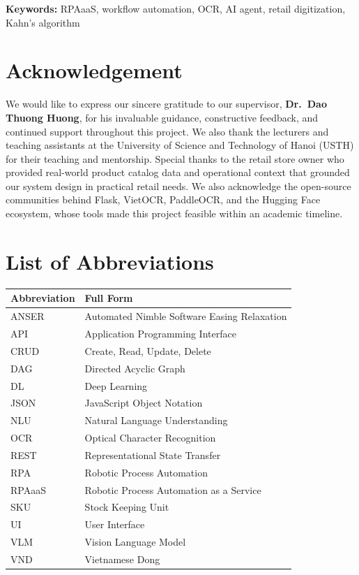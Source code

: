 \documentclass[11pt,a4paper]{report}
\begin{document}
\medskip\noindent
\textbf{Keywords:} RPAaaS, workflow automation, OCR, AI agent, retail digitization, Kahn's algorithm

\chapter*{Acknowledgement}

We would like to express our sincere gratitude to our supervisor, \textbf{Dr.~Dao Thuong Huong}, for his invaluable guidance, constructive feedback, and continued support throughout this project. We also thank the lecturers and teaching assistants at the University of Science and Technology of Hanoi (USTH) for their teaching and mentorship. Special thanks to the retail store owner who provided real-world product catalog data and operational context that grounded our system design in practical retail needs. We also acknowledge the open-source communities behind Flask, VietOCR, PaddleOCR, and the Hugging Face ecosystem, whose tools made this project feasible within an academic timeline.

\tableofcontents

\listoftables

\listoffigures

\chapter*{List of Abbreviations}

\begin{longtable}{@{}ll@{}}
\toprule
\textbf{Abbreviation} & \textbf{Full Form} \\
\midrule
ANSER & Automated Nimble Software Easing Relaxation \\
API   & Application Programming Interface \\
CRUD  & Create, Read, Update, Delete \\
DAG   & Directed Acyclic Graph \\
DL    & Deep Learning \\
JSON  & JavaScript Object Notation \\
NLU   & Natural Language Understanding \\
OCR   & Optical Character Recognition \\
REST  & Representational State Transfer \\
RPA   & Robotic Process Automation \\
RPAaaS & Robotic Process Automation as a Service \\
SKU   & Stock Keeping Unit \\
UI    & User Interface \\
VLM   & Vision Language Model \\
VND   & Vietnamese Dong \\
\bottomrule
\end{longtable}
\end{document}
